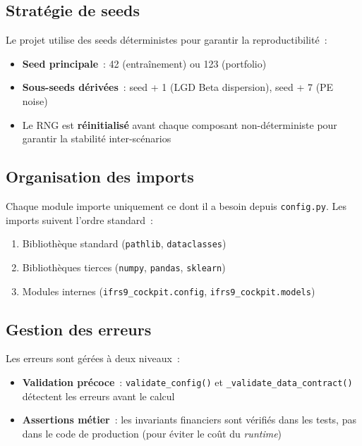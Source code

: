 \documentclass[12pt,a4paper]{article}
\begin{document}
\subsection{Strat\'egie de seeds}

Le projet utilise des seeds d\'eterministes pour garantir la reproductibilit\'e~:

\begin{itemize}[noitemsep]
    \item \textbf{Seed principale}~: 42 (entra\^inement) ou 123 (portfolio)
    \item \textbf{Sous-seeds d\'eriv\'ees}~: seed + 1 (LGD Beta dispersion), seed + 7 (PE noise)
    \item Le RNG est \textbf{r\'einitialis\'e} avant chaque composant non-d\'eterministe pour garantir la stabilit\'e inter-sc\'enarios
\end{itemize}

\subsection{Organisation des imports}

Chaque module importe uniquement ce dont il a besoin depuis \texttt{config.py}. Les imports suivent l'ordre standard~:
\begin{enumerate}[noitemsep]
    \item Biblioth\`eque standard (\texttt{pathlib}, \texttt{dataclasses})
    \item Biblioth\`eques tierces (\texttt{numpy}, \texttt{pandas}, \texttt{sklearn})
    \item Modules internes (\texttt{ifrs9\_cockpit.config}, \texttt{ifrs9\_cockpit.models})
\end{enumerate}

\subsection{Gestion des erreurs}

Les erreurs sont g\'er\'ees \`a deux niveaux~:
\begin{itemize}[noitemsep]
    \item \textbf{Validation pr\'ecoce}~: \texttt{validate\_config()} et \texttt{\_validate\_data\_contract()} d\'etectent les erreurs avant le calcul
    \item \textbf{Assertions m\'etier}~: les invariants financiers sont v\'erifi\'es dans les tests, pas dans le code de production (pour \'eviter le co\^ut du \textit{runtime})
\end{itemize}
\end{document}
